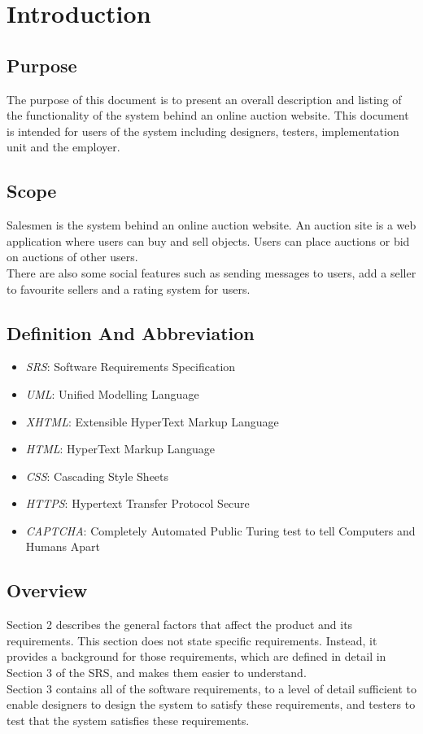 \chapter{Introduction}
\section{Purpose}
	The purpose of this document is to present an overall description and 
	listing of the functionality of the system behind an online auction 
	website. This document is intended for users of the system including
	designers, testers, implementation unit and the employer.
\section{Scope}
	Salesmen is the system behind an online auction website. An auction site 
	is a web application where users can buy and sell objects. Users can 
	place auctions or bid on auctions of other users. \\
	There are also some social features such as sending messages to users,
	add a seller to favourite sellers and a rating system for users.
\section{Definition And Abbreviation}
	\begin{itemize}
		\item \emph{SRS}: Software Requirements Specification
		\item \emph{UML}: Unified Modelling Language
		\item \emph{XHTML}: Extensible HyperText Markup Language
		\item \emph{HTML}: HyperText Markup Language
		\item \emph{CSS}: Cascading Style Sheets
		\item \emph{HTTPS}: Hypertext Transfer Protocol Secure
		\item \emph{CAPTCHA}: Completely Automated Public Turing test to tell Computers and Humans Apart
	\end{itemize}
\section{Overview}
	Section 2 describes the general factors that affect the product and 
	its requirements.                                                                                   
	This section does not state specific requirements. Instead, it provides a 
	background for those requirements, which are defined in detail in Section 
	3 of the SRS, and makes them easier to understand.\\
	Section 3 contains all of the software requirements, to a level of detail 
	sufficient to enable designers to design the system to satisfy these 
	requirements, and testers to test that the system satisfies these
	requirements.
